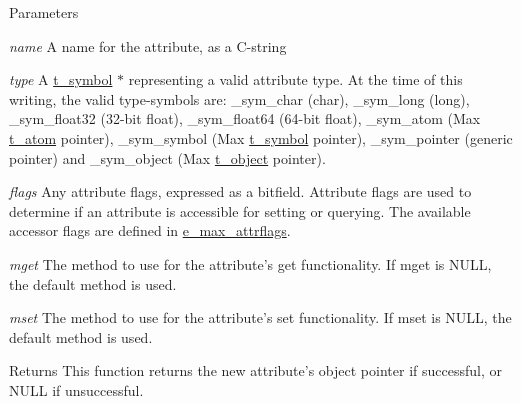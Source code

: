 \begin{DoxyParams}{Parameters}
\item[{\em name}]A name for the attribute, as a C-\/string \item[{\em type}]A \hyperlink{structt__symbol}{t\_\-symbol} $\ast$ representing a valid attribute type. At the time of this writing, the valid type-\/symbols are: {\ttfamily \_\-sym\_\-char} (char), {\ttfamily \_\-sym\_\-long} (long), {\ttfamily \_\-sym\_\-float32} (32-\/bit float), {\ttfamily \_\-sym\_\-float64} (64-\/bit float), {\ttfamily \_\-sym\_\-atom} (Max \hyperlink{structt__atom}{t\_\-atom} pointer), {\ttfamily \_\-sym\_\-symbol} (Max \hyperlink{structt__symbol}{t\_\-symbol} pointer), {\ttfamily \_\-sym\_\-pointer} (generic pointer) and {\ttfamily \_\-sym\_\-object} (Max \hyperlink{structt__object}{t\_\-object} pointer). \item[{\em flags}]Any attribute flags, expressed as a bitfield. Attribute flags are used to determine if an attribute is accessible for setting or querying. The available accessor flags are defined in \hyperlink{group__attr_gaf296cfc6741bb19207f6ed8062809115}{e\_\-max\_\-attrflags}. \item[{\em mget}]The method to use for the attribute's {\ttfamily get} functionality. If {\ttfamily mget} is NULL, the default method is used. \item[{\em mset}]The method to use for the attribute's {\ttfamily set} functionality. If {\ttfamily mset} is NULL, the default method is used.\end{DoxyParams}
\begin{DoxyReturn}{Returns}
This function returns the new attribute's object pointer if successful, or NULL if unsuccessful.
\end{DoxyReturn}
